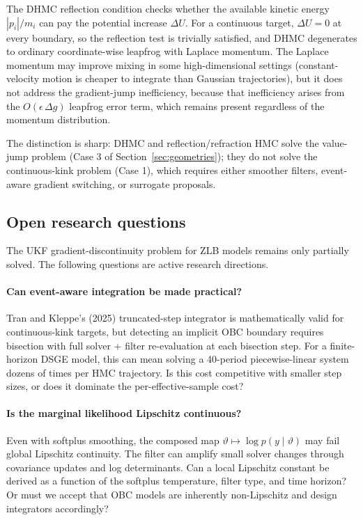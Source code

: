 \documentclass[11pt]{article}
\begin{document}
The DHMC reflection condition checks whether the available kinetic energy
$|p_i|/m_i$ can pay the potential increase $\Delta U$. For a continuous
target, $\Delta U = 0$ at every boundary, so the reflection test is trivially
satisfied, and DHMC degenerates to ordinary coordinate-wise leapfrog with
Laplace momentum. The Laplace momentum may improve mixing in some
high-dimensional settings (constant-velocity motion is cheaper to integrate
than Gaussian trajectories), but it does not address the gradient-jump
inefficiency, because that inefficiency arises from the $O(\epsilon\,\Delta g)$
leapfrog error term, which remains present regardless of the momentum
distribution.

The distinction is sharp: DHMC and reflection/refraction HMC solve the
value-jump problem (Case 3 of Section~\ref{sec:geometries}); they do not solve
the continuous-kink problem (Case 1), which requires either smoother filters,
event-aware gradient switching, or surrogate proposals.

\subsection{Open research questions}\label{sec:ukf-open}

The UKF gradient-discontinuity problem for ZLB models remains only partially
solved. The following questions are active research directions.

\paragraph{Can event-aware integration be made practical?}
Tran and Kleppe's (2025) truncated-step integrator is mathematically valid for
continuous-kink targets, but detecting an implicit OBC boundary requires
bisection with full solver + filter re-evaluation at each bisection step. For
a finite-horizon DSGE model, this can mean solving a 40-period piecewise-linear
system dozens of times per HMC trajectory. Is this cost competitive with
smaller step sizes, or does it dominate the per-effective-sample cost?

\paragraph{Is the marginal likelihood Lipschitz continuous?}
Even with softplus smoothing, the composed map
$\vartheta\mapsto\log p(y\mid\vartheta)$ may fail global Lipschitz continuity.
The filter can amplify small solver changes through covariance updates and log
determinants. Can a local Lipschitz constant be derived as a function of the
softplus temperature, filter type, and time horizon? Or must we accept that
OBC models are inherently non-Lipschitz and design integrators accordingly?
\end{document}
